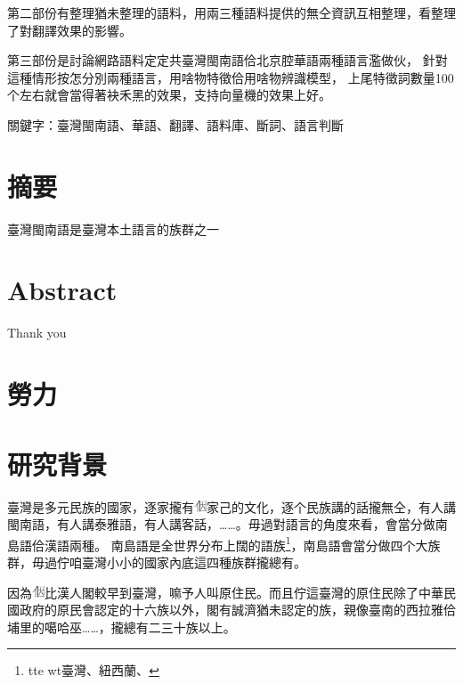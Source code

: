 \documentclass[final,oneside,onecolumn,12pt,a4paper]{book}%
\begin{document}
第二部份有整理猶未整理的語料，用兩三種語料提供的無仝資訊互相整理，看整理了對翻譯效果的影響。

第三部份是討論網路語料定定共臺灣閩南語佮北京腔華語兩種語言濫做伙，
針對這種情形按怎分別兩種語言，用啥物特徵佮用啥物辨識模型，
上尾特徵詞數量100个左右就會當得著袂禾黑的效果，支持向量機的效果上好。

關鍵字：臺灣閩南語、華語、翻譯、語料庫、斷詞、語言判斷
\newpage

\chapter{摘要}
臺灣閩南語是臺灣本土語言的族群之一

\newpage

\chapter{Abstract}

Thank you

\newpage

\chapter{勞力}

\newpage

\tableofcontents
\listoffigures
\listoftables

\mainmatter

\chapter{研究背景}
\label{章：研究背景}

臺灣是多元民族的國家，逐家攏有\includegraphics[height=1em]{字/⿰因}家己的文化，逐个民族講的話攏無仝，有人講閩南語，有人講泰雅語，有人講客話，……。毋過對語言的角度來看，會當分做南島語佮漢語兩種。
南島語是全世界分布上闊的語族\footnote{tte wt臺灣、紐西蘭、}，南島語會當分做四个大族群，毋過佇咱臺灣小小的國家內底這四種族群攏總有。

因為\includegraphics[height=1em]{字/⿰因}比漢人閣較早到臺灣，嘛予人叫原住民。而且佇這臺灣的原住民除了中華民國政府的原民會認定的十六族以外，閣有誠濟猶未認定的族，親像臺南的西拉雅佮埔里的噶哈巫……，攏總有二三十族以上。
\end{document}
